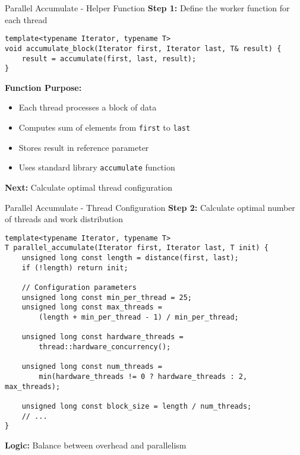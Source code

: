 \begin{frame}[fragile]{Parallel Accumulate - Helper Function}
	\textbf{Step 1:} Define the worker function for each thread

	\begin{verbatim}
template<typename Iterator, typename T>
void accumulate_block(Iterator first, Iterator last, T& result) {
    result = accumulate(first, last, result);
}
	\end{verbatim}

	\textbf{Function Purpose:}
	\begin{itemize}
		\item Each thread processes a block of data
		\item Computes sum of elements from \texttt{first} to \texttt{last}
		\item Stores result in reference parameter
		\item Uses standard library \texttt{accumulate} function
	\end{itemize}

	\vspace{1em}
	\textbf{Next:} Calculate optimal thread configuration
\end{frame}

\begin{frame}[fragile]{Parallel Accumulate - Thread Configuration}
	\textbf{Step 2:} Calculate optimal number of threads and work distribution

	\begin{verbatim}
template<typename Iterator, typename T>
T parallel_accumulate(Iterator first, Iterator last, T init) {
    unsigned long const length = distance(first, last);
    if (!length) return init;

    // Configuration parameters
    unsigned long const min_per_thread = 25;
    unsigned long const max_threads =
        (length + min_per_thread - 1) / min_per_thread;

    unsigned long const hardware_threads =
        thread::hardware_concurrency();

    unsigned long const num_threads =
        min(hardware_threads != 0 ? hardware_threads : 2, max_threads);

    unsigned long const block_size = length / num_threads;
    // ...
}
	\end{verbatim}

	\textbf{Logic:} Balance between overhead and parallelism
\end{frame}

